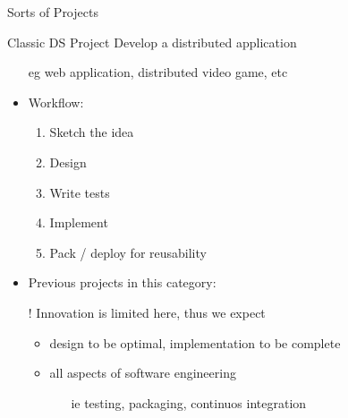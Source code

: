 \documentclass[presentation]{beamer}\mode<presentation>{\usetheme{AMSBolognaFC}}
\begin{document}
\begin{frame}[c, allowframebreaks]{Sorts of Projects}

    \begin{block}{Classic DS Project}
        Develop a distributed application
        \begin{itemize}
            \item[eg] web application, distributed video game, etc
            \item Workflow:
            \begin{enumerate}
                \item Sketch the idea
                \item Design
                \item Write tests
                \item Implement
                \item Pack / deploy for reusability
            \end{enumerate}
            \item Previous projects in this category: \cite{Sd2021ProjectGuessR,Sd2021ProjectCAHu}
            \item[!] Innovation is limited here, thus we expect
            \begin{itemize}
                \item design to be optimal, implementation to be complete
                \item all aspects of software engineering
                \begin{itemize}
                    \item[ie] testing, packaging, continuos integration
                \end{itemize}
            \end{itemize}
        \end{itemize}
    \end{block}


\end{frame}
\end{document}
